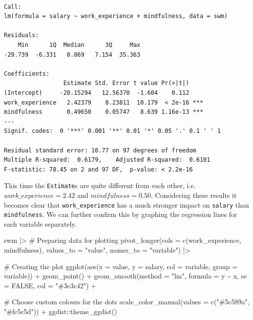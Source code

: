 \documentclass[
  letterpaper,
]{krantz}
\makeatletter
\newenvironment{Shaded}{\begin{snugshade}}{\end{snugshade}}
\newcommand{\AttributeTok}[1]{\textcolor[rgb]{0.40,0.45,0.13}{#1}}
\newcommand{\CommentTok}[1]{\textcolor[rgb]{0.37,0.37,0.37}{#1}}
\newcommand{\ConstantTok}[1]{\textcolor[rgb]{0.56,0.35,0.01}{#1}}
\newcommand{\FunctionTok}[1]{\textcolor[rgb]{0.28,0.35,0.67}{#1}}
\newcommand{\NormalTok}[1]{\textcolor[rgb]{0.00,0.23,0.31}{#1}}
\newcommand{\SpecialCharTok}[1]{\textcolor[rgb]{0.37,0.37,0.37}{#1}}
\newcommand{\StringTok}[1]{\textcolor[rgb]{0.13,0.47,0.30}{#1}}
\newenvironment{kframe}{%
\medskip{}
\setlength{\fboxsep}{.8em}
 \def\at@end@of@kframe{}%
 \ifinner\ifhmode%
  \def\at@end@of@kframe{\end{minipage}}%
  \begin{minipage}{\columnwidth}%
 \fi\fi%
 \def\FrameCommand##1{\hskip\@totalleftmargin \hskip-\fboxsep
 \colorbox{shadecolor}{##1}\hskip-\fboxsep
     \hskip-\linewidth \hskip-\@totalleftmargin \hskip\columnwidth}%
 \MakeFramed {\advance\hsize-\width
   \@totalleftmargin\z@ \linewidth\hsize
   \@setminipage}}%
 {\par\unskip\endMakeFramed%
 \at@end@of@kframe}
\renewenvironment{Shaded}{\begin{kframe}}{\end{kframe}}
\makeatother
\begin{document}
\begin{verbatim}

Call:
lm(formula = salary ~ work_experience + mindfulness, data = swm)

Residuals:
    Min      1Q  Median      3Q     Max 
-29.739  -6.331   0.869   7.154  35.363 

Coefficients:
                 Estimate Std. Error t value Pr(>|t|)    
(Intercept)     -20.15294   12.56370  -1.604    0.112    
work_experience   2.42379    0.23811  10.179  < 2e-16 ***
mindfulness       0.49650    0.05747   8.639 1.16e-13 ***
---
Signif. codes:  0 '***' 0.001 '**' 0.01 '*' 0.05 '.' 0.1 ' ' 1

Residual standard error: 10.77 on 97 degrees of freedom
Multiple R-squared:  0.6179,    Adjusted R-squared:  0.6101 
F-statistic: 78.45 on 2 and 97 DF,  p-value: < 2.2e-16
\end{verbatim}

This time the \texttt{Estimate}s are quite different from each other,
i.e.~\(work\_experience = 2.42\) and \(mindfulness = 0.50\). Considering
these results it becomes clear that \texttt{work\_experience} has a much
stronger impact on \texttt{salary} than \texttt{mindfulness}. We can
further confirm this by graphing the regression lines for each variable
separately.

\begin{Shaded}
\begin{Highlighting}[]
\NormalTok{swm }\SpecialCharTok{|\textgreater{}}
  \CommentTok{\# Preparing data for plotting}
  \FunctionTok{pivot\_longer}\NormalTok{(}\AttributeTok{cols =} \FunctionTok{c}\NormalTok{(work\_experience, mindfulness),}
               \AttributeTok{values\_to =} \StringTok{"value"}\NormalTok{,}
               \AttributeTok{names\_to =} \StringTok{"variable"}\NormalTok{) }\SpecialCharTok{|\textgreater{}}
  
  \CommentTok{\# Creating the plot}
  \FunctionTok{ggplot}\NormalTok{(}\FunctionTok{aes}\NormalTok{(}\AttributeTok{x =}\NormalTok{ value,}
             \AttributeTok{y =}\NormalTok{ salary,}
             \AttributeTok{col =}\NormalTok{ variable,}
             \AttributeTok{group =}\NormalTok{ variable)) }\SpecialCharTok{+}
  \FunctionTok{geom\_point}\NormalTok{() }\SpecialCharTok{+}
  \FunctionTok{geom\_smooth}\NormalTok{(}\AttributeTok{method =} \StringTok{"lm"}\NormalTok{,}
              \AttributeTok{formula =}\NormalTok{ y }\SpecialCharTok{\textasciitilde{}}\NormalTok{ x,}
              \AttributeTok{se =} \ConstantTok{FALSE}\NormalTok{,}
              \AttributeTok{col =} \StringTok{"\#3e3c42"}\NormalTok{) }\SpecialCharTok{+}
  
  \CommentTok{\# Choose custom colours for the dots}
  \FunctionTok{scale\_color\_manual}\NormalTok{(}\AttributeTok{values =} \FunctionTok{c}\NormalTok{(}\StringTok{"\#5c589a"}\NormalTok{, }\StringTok{"\#fc5c5d"}\NormalTok{)) }\SpecialCharTok{+}
\NormalTok{  ggdist}\SpecialCharTok{::}\FunctionTok{theme\_ggdist}\NormalTok{()}
\end{Highlighting}
\end{Shaded}
\end{document}
